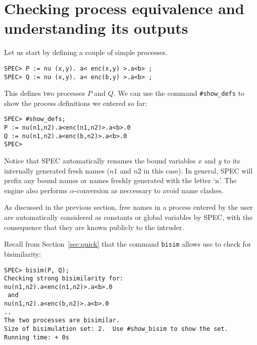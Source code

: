 \documentclass{article}
\begin{document}
\section{Checking process equivalence and understanding its outputs}
\label{sec:equiv}

Let us start by defining a couple of simple processes. 
\begin{verbatim}
SPEC> P := nu (x,y). a< enc(x,y) >.a<b> ;
SPEC> Q := nu (x,y). a< enc(b,y) >.a<b> ;
\end{verbatim}
This defines two processes $P$ and $Q$. We can use the command
\texttt{\#show\_defs} to show the process definitions we entered so far:
\begin{verbatim}
SPEC> #show_defs;
P := nu(n1,n2).a<enc(n1,n2)>.a<b>.0
Q := nu(n1,n2).a<enc(b,n2)>.a<b>.0
SPEC> 
\end{verbatim}
Notice that SPEC automatically renames the bound variables $x$ and $y$
to its internally generated fresh names ($n1$ and $n2$ in this case).
In general, SPEC will prefix any bound names or names freshly 
generated with the letter `n'. The engine also performs $\alpha$-conversion
as neccessary to avoid name clashes. 

As discussed in the previous section, free names in a process entered by the user
 are automatically
considered as constants or global variables by SPEC, with the consequence that they are known publicly
to the intruder. 

Recall from Section~\ref{sec:quick} that the command \texttt{bisim} allows use to check
for bisimilarity: 
\begin{verbatim}
SPEC> bisim(P, Q);
Checking strong bisimilarity for: 
nu(n1,n2).a<enc(n1,n2)>.a<b>.0
 and 
nu(n1,n2).a<enc(b,n2)>.a<b>.0
..
The two processes are bisimilar.
Size of bisimulation set: 2.  Use #show_bisim to show the set.
Running time: + 0s
\end{verbatim}
\end{document}
